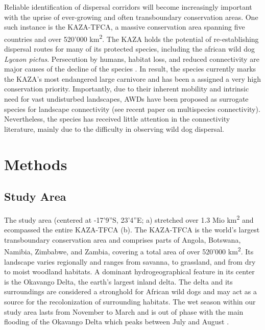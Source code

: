 \documentclass[abstract=on,10pt,a4paper,bibliography=totocnumbered]{article}
\begin{document}
Reliable identification of dispersal corridors will become increasingly
important with the uprise of ever-growing and often transboundary conservation
areas. One such instance is the KAZA-TFCA, a massive conservation area spanning
five countries and over 520'000 km\textsuperscript{2}. The KAZA holds the
potential of re-establishing dispersal routes for many of its protected species,
including the african wild dog \textit{Lycaon pictus}.  Persecution by humans,
habitat loss, and reduced connectivity are major causes of the decline of the
species \citep{Woodroffe.2012}. In result, the species currently marks the
KAZA's most endangered large carnivore and has been a assigned a very high
conservation priority. Importantly, due to their inherent mobility and intrinsic
need for vast undisturbed landscapes, AWDs have been proposed as surrogate
species for landscape connectivity (see recent paper on multispecies
connectivity). Nevertheless, the species has received little attention in the
connectivity literature, mainly due to the difficulty in observing wild dog
dispersal.

\section{Methods}
\subsection{Study Area}
The study area (centered at -17'9''S, 23'4''E;
a) stretched over 1.3 Mio km\textsuperscript{2} and ecompassed
the entire KAZA-TFCA (b). The KAZA-TFCA is the world's largest
transboundary conservation area and comprises parts of Angola, Botswana,
Namibia, Zimbabwe, and Zambia, covering a total area of over 520'000
km\textsuperscript{2}. Its landscape varies regionally and ranges from savanna,
to grassland, and from dry to moist woodland habitats. A dominant
hydrogeographical feature in its center is the Okavango Delta, the earth's
largest inland delta. The delta and its surroundings are considered a stronghold
for African wild dogs and may act as a source for the recolonization of
surrounding habitats. The wet season within our study area lasts from November
to March and is out of phase with the main flooding of the Okavango Delta which
peaks between July and August \citep{McNutt.1996, Wolski.2017}.
\end{document}
